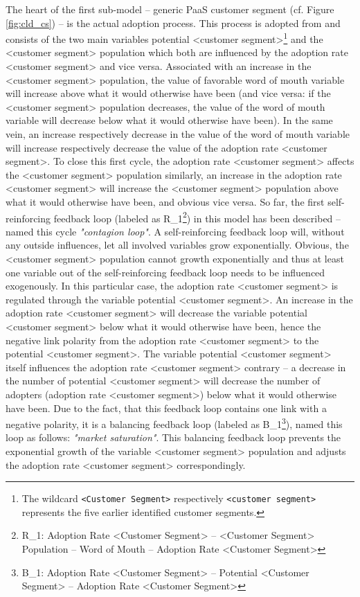 The heart of the first sub-model -- generic \ac{PaaS} customer segment (cf. Figure \ref{fig:cld_cs}) -- is the actual adoption process. This process is adopted from \citet[p. 18]{Sterman2001} and consists of the two main variables potential <customer segment>\footnote{The wildcard \texttt{<Customer Segment>} respectively \texttt{<customer segment>} represents the five earlier identified customer segments.} and the <customer segment> population which both are influenced by the adoption rate <customer segment> and vice versa. Associated with an increase in the <customer segment> population, the value of favorable word of mouth variable will increase above what it would otherwise have been (and vice versa: if the <customer segment> population decreases, the value of the word of mouth variable will decrease below what it would otherwise have been). In the same vein, an increase respectively decrease in the value of the word of mouth variable will increase respectively decrease the value of the adoption rate <customer segment>. To close this first cycle, the adoption rate <customer segment> affects the <customer segment> population similarly, an increase in the adoption rate <customer segment> will increase the <customer segment> population above what it would otherwise have been, and obvious vice versa. So far, the first self-reinforcing feedback loop (labeled as R\_1\footnote{R\_1: Adoption Rate <Customer Segment> -- <Customer Segment> Population -- Word of Mouth -- Adoption Rate <Customer Segment>}) in this model has been described -- \citet[p. 19]{Sterman2001} named this cycle \textit{"contagion loop"}. A self-reinforcing feedback loop will, without any outside influences, let all involved variables grow exponentially. Obvious, the <customer segment> population cannot growth exponentially and thus at least one variable out of the self-reinforcing feedback loop needs to be influenced exogenously. In this particular case, the adoption rate <customer segment> is regulated through the variable potential <customer segment>. An increase in the adoption rate <customer segment> will decrease the variable potential <customer segment> below what it would otherwise have been, hence the negative link polarity from the adoption rate <customer segment> to the potential <customer segment>. The variable potential <customer segment> itself influences the adoption rate <customer segment> contrary -- a decrease in the number of potential <customer segment> will decrease the number of adopters (adoption rate <customer segment>) below what it would otherwise have been. Due to the fact, that this feedback loop contains one link with a negative polarity, it is a balancing feedback loop (labeled as B\_1\footnote{B\_1: Adoption Rate <Customer Segment> -- Potential <Customer Segment> -- Adoption Rate <Customer Segment>}), \citet[p. 18]{Sterman2001} named this loop as follows: \textit{"market saturation"}. This balancing feedback loop prevents the exponential growth of the variable <customer segment> population and adjusts the adoption rate <customer segment> correspondingly.

